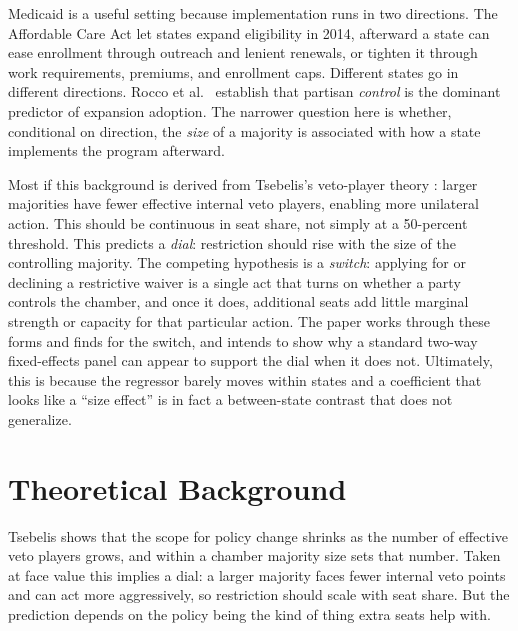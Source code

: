 \documentclass[9pt,twoside]{pnas-new}
\begin{document}
Medicaid is a useful setting because implementation runs in two directions. The Affordable Care Act let states expand eligibility in 2014, afterward a state can ease enrollment through outreach and lenient renewals, or tighten it through work requirements, premiums, and enrollment caps. Different states go in different directions. Rocco et al.\ \cite{rocco2020} establish that partisan \emph{control} is the dominant predictor of expansion adoption. The narrower question here is whether, conditional on direction, the \emph{size} of a majority is associated with how a state implements the program afterward.

Most if this background is derived from Tsebelis's veto-player theory \cite{tsebelis2002}: larger majorities have fewer effective internal veto players, enabling more unilateral action. This should be continuous in seat share, not simply at a 50-percent threshold. This predicts a \emph{dial}: restriction should rise with the size of the controlling majority. The competing hypothesis is a \emph{switch}: applying for or declining a restrictive waiver is a single act that turns on whether a party controls the chamber, and once it does, additional seats add little marginal strength or capacity for that particular action. The paper works through these forms and finds for the switch, and intends to show why a standard two-way fixed-effects panel can appear to support the dial when it does not. Ultimately, this is because the regressor barely moves within states and a coefficient that looks like a ``size effect'' is in fact a between-state contrast that does not generalize.

\section*{Theoretical Background}




Tsebelis \cite{tsebelis2002} shows that the scope for policy change shrinks as the number of effective veto players grows, and within a chamber majority size sets that number. Taken at face value this implies a dial: a larger majority faces fewer internal veto points and can act more aggressively, so restriction should scale with seat share. But the prediction depends on the policy being the kind of thing extra seats help with. 
\end{document}
